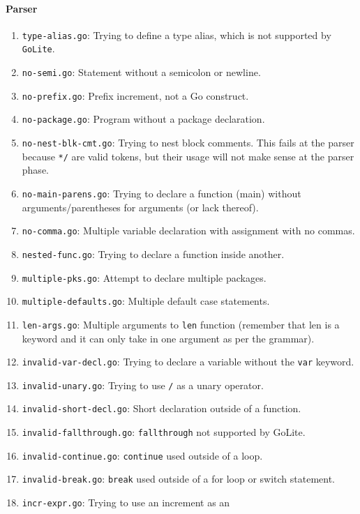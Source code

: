 \documentclass[11pt]{article}
\begin{document}
\paragraph{Parser}
\begin{enumerate}
\item \texttt{type-alias.go}: Trying to define a type alias, which is
  not supported by \texttt{GoLite}.
\item \texttt{no-semi.go}: Statement without a semicolon or newline.
\item \texttt{no-prefix.go}: Prefix increment, not a Go construct.
\item \texttt{no-package.go}: Program without a package declaration.
\item \texttt{no-nest-blk-cmt.go}: Trying to nest block comments. This
  fails at the parser because \texttt{*/} are valid tokens, but their
  usage will not make sense at the parser phase.
\item \texttt{no-main-parens.go}: Trying to declare a function (main)
  without arguments/parentheses for arguments (or lack thereof).
\item \texttt{no-comma.go}: Multiple variable declaration with
  assignment with no commas.
\item \texttt{nested-func.go}: Trying to declare a function inside
  another.
\item \texttt{multiple-pks.go}: Attempt to declare multiple packages.
\item \texttt{multiple-defaults.go}: Multiple default case statements.
\item \texttt{len-args.go}: Multiple arguments to \texttt{len}
  function (remember that len is a keyword and it can only take in one
  argument as per the grammar).
\item \texttt{invalid-var-decl.go}: Trying to declare a variable
  without the \texttt{var} keyword.
\item \texttt{invalid-unary.go}: Trying to use \texttt{/} as a unary
  operator.
\item \texttt{invalid-short-decl.go}: Short declaration outside of a
  function.
\item \texttt{invalid-fallthrough.go}: \texttt{fallthrough} not
  supported by GoLite.
\item \texttt{invalid-continue.go}: \texttt{continue} used outside of
  a loop.
\item \texttt{invalid-break.go}: \texttt{break} used outside of a for
  loop or switch statement.
\item \texttt{incr-expr.go}: Trying to use an increment as an

\end{enumerate}
\end{document}
